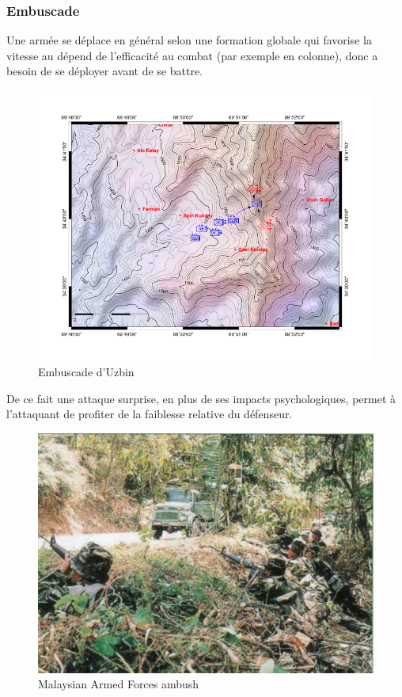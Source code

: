 \documentclass{article}
\begin{document}
\subsubsection{Embuscade}
Une armée se déplace en général selon une formation globale qui favorise la vitesse au dépend de l'efficacité au combat (par exemple en colonne), donc a besoin de se déployer avant de se battre.
\begin{figure}[H]
	\begin{centering}
	\includegraphics[width=\linewidth]{../ressources/Uzbin_valley_ambush-map}
	\caption{Embuscade d'Uzbin \cite{uzbin_ambush}}
	\end{centering}
\end{figure}
De ce fait une attaque surprise, en plus de ses impacts psychologiques, permet à l'attaquant de profiter de la faiblesse relative du défenseur.
\begin{figure}[H]
	\begin{centering}
	\includegraphics[width=0.8\linewidth]{../ressources/ambush}
	\caption{Malaysian Armed Forces ambush \cite{ambush_picture}}
	\end{centering}
\end{figure}
\cite{ambush_wiki}
\end{document}
